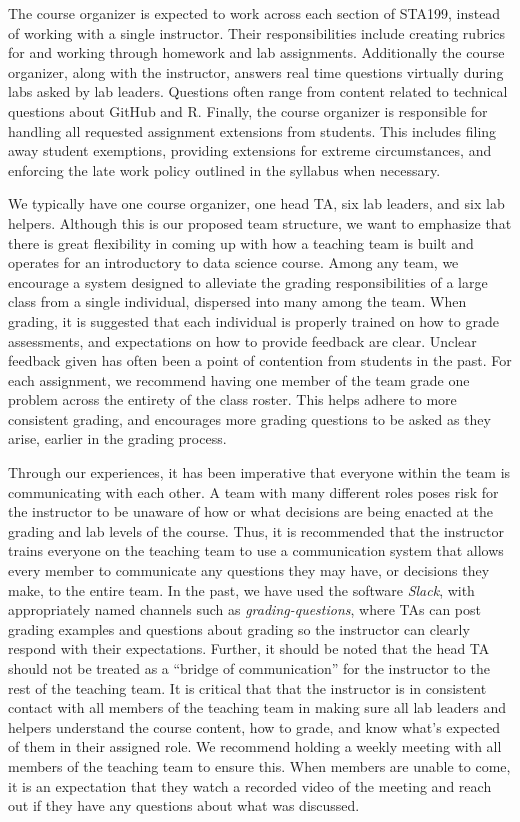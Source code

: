 \documentclass[
  12pt]{article}
\begin{document}
The course organizer is expected to work across each section of STA199,
instead of working with a single instructor. Their responsibilities
include creating rubrics for and working through homework and lab
assignments. Additionally the course organizer, along with the
instructor, answers real time questions virtually during labs asked by
lab leaders. Questions often range from content related to technical
questions about GitHub and R. Finally, the course organizer is
responsible for handling all requested assignment extensions from
students. This includes filing away student exemptions, providing
extensions for extreme circumstances, and enforcing the late work policy
outlined in the syllabus when necessary.

We typically have one course organizer, one head TA, six lab leaders,
and six lab helpers. Although this is our proposed team structure, we
want to emphasize that there is great flexibility in coming up with how
a teaching team is built and operates for an introductory to data
science course. Among any team, we encourage a system designed to
alleviate the grading responsibilities of a large class from a single
individual, dispersed into many among the team. When grading, it is
suggested that each individual is properly trained on how to grade
assessments, and expectations on how to provide feedback are clear.
Unclear feedback given has often been a point of contention from
students in the past. For each assignment, we recommend having one
member of the team grade one problem across the entirety of the class
roster. This helps adhere to more consistent grading, and encourages
more grading questions to be asked as they arise, earlier in the grading
process.

Through our experiences, it has been imperative that everyone within the
team is communicating with each other. A team with many different roles
poses risk for the instructor to be unaware of how or what decisions are
being enacted at the grading and lab levels of the course. Thus, it is
recommended that the instructor trains everyone on the teaching team to
use a communication system that allows every member to communicate any
questions they may have, or decisions they make, to the entire team. In
the past, we have used the software \emph{Slack}, with appropriately
named channels such as \emph{grading-questions}, where TAs can post
grading examples and questions about grading so the instructor can
clearly respond with their expectations. Further, it should be noted
that the head TA should not be treated as a ``bridge of communication''
for the instructor to the rest of the teaching team. It is critical that
that the instructor is in consistent contact with all members of the
teaching team in making sure all lab leaders and helpers understand the
course content, how to grade, and know what's expected of them in their
assigned role. We recommend holding a weekly meeting with all members of
the teaching team to ensure this. When members are unable to come, it is
an expectation that they watch a recorded video of the meeting and reach
out if they have any questions about what was discussed.
\end{document}
